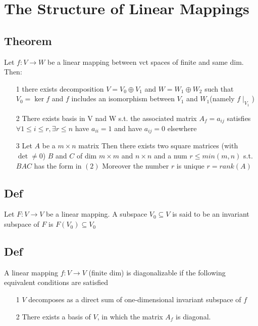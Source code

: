 \documentclass{book}
\begin{document}
\chapter{The Structure of Linear Mappings}
\section{Theorem}
Let $f:V\rightarrow W$ be a linear mapping between vct spaces of finite and same dim. Then:
\begin{itemize}
    \item [1] there exists decomposition $V=V_0\oplus V_1$ and $W=W_1\oplus W_2$ such that $V_0=\ker f$ and $f$ includes an isomorphism between $V_1$ and $W_1$(namely $f\mid_{V_1}$)
    \item [2] There exists basis in V nad W s.t. the associated matrix $A_f=a_{ij}$ satisfies $\forall 1\leq i\leq r,\exists r\leq n$ have $a_{ii}=1$ and  have $a_{ij}=0$ elsewhere
    \item [3] Let $A$ be a $m\times n$ matrix Then there exists two square matrices (with $\det\neq 0$) $B$ and $C$ of dim $m\times m$ and $n\times n$ and a num $r\leq min(m,n)$ s.t. $BAC$ has the form in $(2)$ Moreover the number $r$ is unique $r=rank(A)$
    
\end{itemize}

\section{Def}
Let $F:V\rightarrow V$ be a linear mapping. A subspace $V_0\subseteq V$ is said to be an invariant subspace of $F$ is $F(V_0)\subseteq V_0$
\section{Def}
A linear mapping $f:V\rightarrow V$ (finite dim) is diagonalizable if the following equivalent conditions are satisfied
\begin{itemize}
    \item [1] $V$ decomposes as a direct sum of one-dimensional invariant subspace of $f$
    \item [2] There exists a basis of $V$, in which the matrix $A_f$ is diagonal.
\end{itemize}
\end{document}
